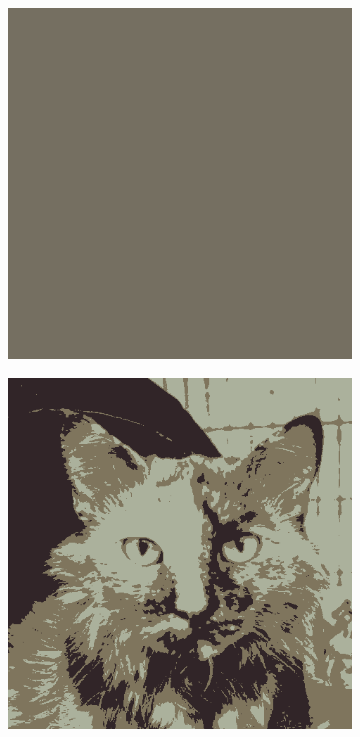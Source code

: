\begin{figure}[htb]
    \centering 
    \begin{subfigure}{.3\textwidth}
        \includegraphics[width=\linewidth]{../../python_code/plots/kmeans/cat-10/reconstruction-1.png}
    \end{subfigure}
    \begin{subfigure}{.3\textwidth}
        \includegraphics[width=\linewidth]{../../python_code/plots/kmeans/cat-10/reconstruction-3.png}

\end{subfigure}
\end{figure}
